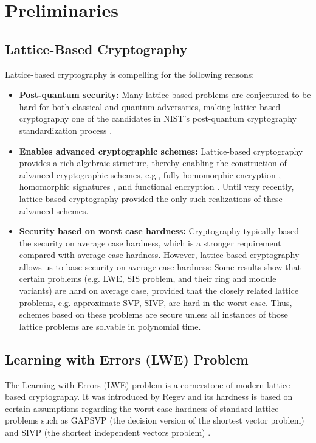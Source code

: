 \section{Preliminaries}
    \subsection{Lattice-Based Cryptography} 
    Lattice-based cryptography is compelling for the following reasons:
    \begin{itemize}
        \item \textbf{Post-quantum security:} Many lattice-based problems are conjectured to be hard for both classical and quantum adversaries, making lattice-based cryptography one of the candidates in NIST's post-quantum cryptography standardization process \cite{nist_pqc}.
        \item \textbf{Enables advanced cryptographic schemes:} Lattice-based cryptography provides a rich algebraic structure, thereby enabling the construction of advanced cryptographic schemes, e.g., fully homomorphic encryption \cite{BGV} \cite{bfv1} \cite{bfv2}, homomorphic signatures \cite{hsig}, and functional encryption \cite{FE}. Until very recently, lattice-based cryptography
        provided the only such realizations of these advanced schemes.
        \item \textbf{Security based on worst case hardness:} Cryptography typically based the security on average case hardness, which is a stronger requirement compared with average case hardness. However, lattice-based cryptography allows us to base security on average case hardness: Some results \cite{av1} \cite{av2} \cite{av3} \cite{av4} \cite{av5} show that certain problems (e.g. LWE, SIS problem, and their ring and module variants) are hard on average case, provided that the closely related lattice problems, e.g. approximate SVP, SIVP, are hard in the worst case. Thus, schemes based on these problems are secure unless all instances of those lattice problems are solvable in polynomial time.
    \end{itemize}
    \subsection{Learning with Errors (LWE) Problem} 
    The Learning with Errors (LWE) problem is a cornerstone of modern lattice-based cryptography. It was introduced by Regev \cite{av1} and its hardness is based on certain assumptions regarding the worst-case hardness of standard lattice problems such as GAPSVP (the decision version of the shortest vector problem) and SIVP (the shortest independent vectors problem) \cite{Reg05, Pei09a}.
    
